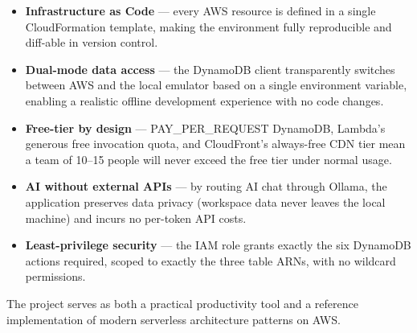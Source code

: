 \documentclass[12pt,a4paper]{report}
\begin{document}
\begin{itemize}[leftmargin=2em]
  \item \textbf{Infrastructure as Code} — every AWS resource is defined in a single
        CloudFormation template, making the environment fully reproducible and diff-able
        in version control.
  \item \textbf{Dual-mode data access} — the DynamoDB client transparently switches
        between AWS and the local emulator based on a single environment variable,
        enabling a realistic offline development experience with no code changes.
  \item \textbf{Free-tier by design} — PAY\_PER\_REQUEST DynamoDB, Lambda's generous
        free invocation quota, and CloudFront's always-free CDN tier mean a team of
        10--15 people will never exceed the free tier under normal usage.
  \item \textbf{AI without external APIs} — by routing AI chat through Ollama, the
        application preserves data privacy (workspace data never leaves the local
        machine) and incurs no per-token API costs.
  \item \textbf{Least-privilege security} — the IAM role grants exactly the six
        DynamoDB actions required, scoped to exactly the three table ARNs, with no
        wildcard permissions.
\end{itemize}

The project serves as both a practical productivity tool and a reference implementation
of modern serverless architecture patterns on AWS.
\end{document}
